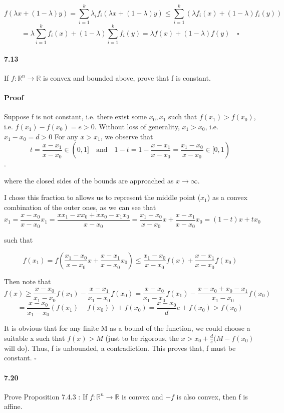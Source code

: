 \documentclass[letterpaper,12pt]{article}
\theoremstyle{definition}
\begin{document}
$$ f(\lambda x + (1 - \lambda)y) = \sum_{ i = 1}^{k} \lambda_i f_i(\lambda x + (1 - \lambda)y) \le \sum_{ i = 1}^{k} (\lambda f_i(x) + (1 - \lambda)f_i(y) )$$
$$= \lambda \sum_{ i = 1}^{k} f_i(x) + (1 - \lambda) \sum_{i = 1}^{k} f_i(y) = \lambda f(x) + (1 - \lambda)f(y) \quad \square$$


\paragraph{7.13} If $f: \mathbb{R}^n \rightarrow \mathbb{R}$ is convex and bounded above, prove that f is constant.

\paragraph{Proof} 
Suppose f is not constant, i.e. there exist some $x_0, x_1$ such that $f(x_1) > f(x_0)$, i.e. $f(x_1) - f(x_0) = e > 0$. Without loss of generality, $x_1 > x_0$, i.e. $x_1 - x_0 = d > 0$ For any $x > x_1$, we observe that $$t = \frac{x - x_1}{x - x_0} \in (0, 1] \quad 
\text{and} \quad 1 - t = 1 - \frac{x - x_1}{x - x_0} = \frac{x_1 - x_0}{x - x_0} \in [0, 1)$$. 

where the closed sides of the bounds are approached as $x \rightarrow \infty$.

I chose this fraction to allows us to represent the middle point ($x_1$) as a convex combination of the outer ones, as we can see that 
$$ x_1 = \frac{x - x_0}{x - x_0} x_1 
= \frac{xx_1 - xx_0 + xx_0 - x_1x_0}{x - x_0}
= \frac{x_1 - x_0}{x - x_0}x + \frac{x - x_1}{x - x_0}x_0 
= (1 - t) x + t x_0 $$

such that 

$$ f(x_1) = f(\frac{x_1 - x_0}{x - x_0}x + \frac{x - x_1}{x - x_0}x_0)
\le \frac{x_1 - x_0}{x - x_0}f(x) + \frac{x - x_1}{x - x_0}f(x_0) $$

Then note that 
$$ f(x) \ge \frac{x - x_0}{x_1 - x_0} f(x_1) - \frac{x - x_1}{x_1 - x_0}f(x_0) = \frac{x - x_0}{x_1 - x_0} f(x_1) - \frac{x - x_0 + x_0 - x_1}{x_1 - x_0}f(x_0) $$
$$ = \frac{x - x_0}{x_1 - x_0} (f(x_1) - f(x_0)) + f(x_0)
= \frac{x - x_0}{d} e + f(x_0)> f(x_0) $$

It is obvious that for any finite M as a bound of the function, we could choose a suitable x such that $f(x) > M$ (just to be rigorous, the $x > x_0 + \frac{d}{e}(M - f(x_0)$ will do). Thus,  f is unbounded, a contradiction.
This proves that, f must be constant. $\square$


\paragraph{7.20} Prove Proposition 7.4.3 :  If $f: \mathbb{R}^n \rightarrow \mathbb{R}$ is convex and $-f$ is also convex, then f is affine.
\end{document}
